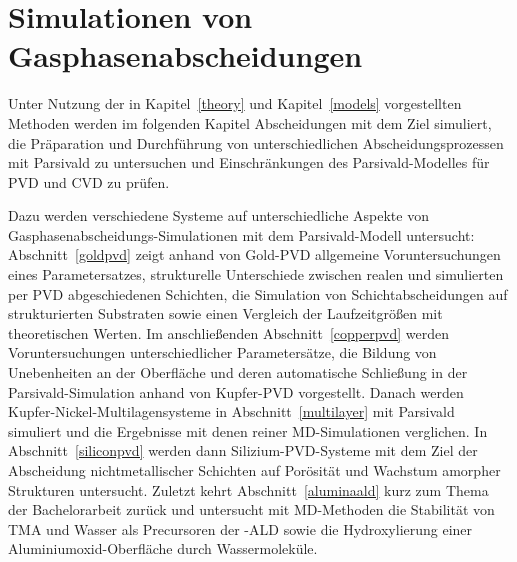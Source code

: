 \chapter{Simulationen von Gasphasenabscheidungen}
\label{results}

Unter Nutzung der in Kapitel~\ref{theory} und Kapitel~\ref{models} vorgestellten Methoden werden im folgenden Kapitel Abscheidungen mit dem Ziel simuliert, die Präparation und Durchführung von unterschiedlichen Abscheidungsprozessen mit Parsivald zu untersuchen und Einschränkungen des Parsivald-Modelles für PVD und CVD zu prüfen.

Dazu werden verschiedene Systeme auf unterschiedliche Aspekte von Gas\-phasen\-abschei\-dungs-Simu\-la\-tionen mit dem Parsivald-Modell untersucht:
Abschnitt~\ref{goldpvd} zeigt anhand von Gold-PVD allgemeine Voruntersuchungen eines Parametersatzes, strukturelle Unterschiede zwischen realen und simulierten per PVD abgeschiedenen Schichten, die Simulation von Schichtabscheidungen auf strukturierten Substraten sowie einen Vergleich der Laufzeitgrößen mit theoretischen Werten.
Im anschließenden Abschnitt~\ref{copperpvd} werden Voruntersuchungen unterschiedlicher Parametersätze, die Bildung von Unebenheiten an der Oberfläche und deren automatische Schließung in der Parsivald-Simulation anhand von Kupfer-PVD vorgestellt.
Danach werden Kupfer-Nickel-Multi\-lagen\-systeme in Abschnitt~\ref{multilayer} mit Parsivald simuliert und die Ergebnisse mit denen reiner MD-Simulationen verglichen.
In Abschnitt~\ref{siliconpvd} werden dann Silizium-PVD-Systeme mit dem Ziel der Abscheidung nichtmetallischer Schichten auf Porösität und Wachstum amorpher Strukturen untersucht.
Zuletzt kehrt Abschnitt~\ref{aluminaald} kurz zum Thema der Bachelorarbeit zurück und untersucht mit MD-Methoden die Stabilität von TMA und Wasser als Precursoren der -ALD sowie die Hydroxylierung einer Aluminiumoxid-Oberfläche durch Wassermoleküle.

